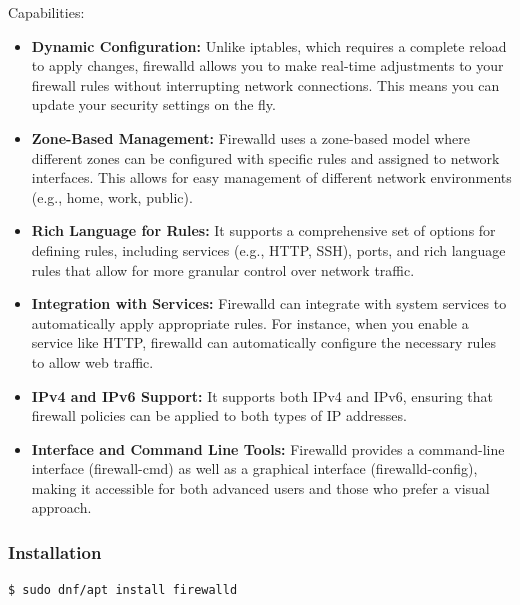 \documentclass{article}
\newenvironment{codetemplate}[1][]{%
  \mybasecolorbox[#1]
  \itshape
}{%
  \endmybasecolorbox
}
\begin{document}
Capabilities:
\begin{itemize}
    \item \textbf{Dynamic Configuration:} Unlike iptables, which requires a complete reload to apply changes, firewalld allows you to make real-time adjustments to your firewall rules without interrupting network connections. This means you can update your security settings on the fly.
    
    \item \textbf{Zone-Based Management:} Firewalld uses a zone-based model where different zones can be configured with specific rules and assigned to network interfaces. This allows for easy management of different network environments (e.g., home, work, public).
    
    \item \textbf{Rich Language for Rules:} It supports a comprehensive set of options for defining rules, including services (e.g., HTTP, SSH), ports, and rich language rules that allow for more granular control over network traffic.
    
    \item \textbf{Integration with Services:} Firewalld can integrate with system services to automatically apply appropriate rules. For instance, when you enable a service like HTTP, firewalld can automatically configure the necessary rules to allow web traffic.
    
    \item \textbf{IPv4 and IPv6 Support:} It supports both IPv4 and IPv6, ensuring that firewall policies can be applied to both types of IP addresses.
    
    \item \textbf{Interface and Command Line Tools:} Firewalld provides a command-line interface (firewall-cmd) as well as a graphical interface (firewalld-config), making it accessible for both advanced users and those who prefer a visual approach.
\end{itemize}

\subsubsection{Installation}

\begin{codetemplate}
\begin{verbatim}
$ sudo dnf/apt install firewalld
\end{verbatim}
\end{codetemplate}
\end{document}
